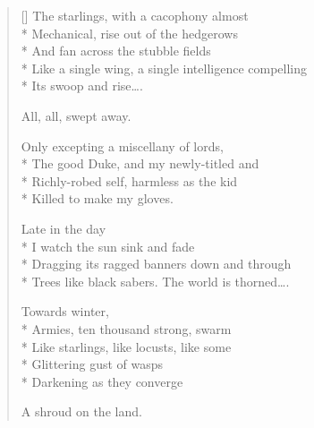 \label{ch:lear_bs}
\settowidth{\versewidth}{Trees like black sabers. \qquad The world is thorned\dots.}
\begin{verse}[\versewidth]
 The starlings, with a cacophony almost\\*
Mechanical, rise out of the hedgerows\\*
And fan across the stubble fields\\*
Like a single wing, a single intelligence compelling\\*
Its swoop and rise\dots.

\hspace*{3\vgap} All, all, swept away.

Only excepting a miscellany of lords,\\*
The good Duke, and my newly-titled and\\*
Richly-robed self, harmless as the kid\\*
Killed to make my gloves.

\hspace*{3\vgap} Late in the day\\*
I watch the sun sink and fade\\*
Dragging its ragged banners down and through\\*
Trees like black sabers. \qquad The world is thorned\dots.

Towards winter,\\*
Armies, ten thousand strong, swarm\\*
Like starlings, like locusts, like some\\*
Glittering gust of wasps\\*
Darkening as they converge

A shroud on the land.\qquad
\end{verse}
